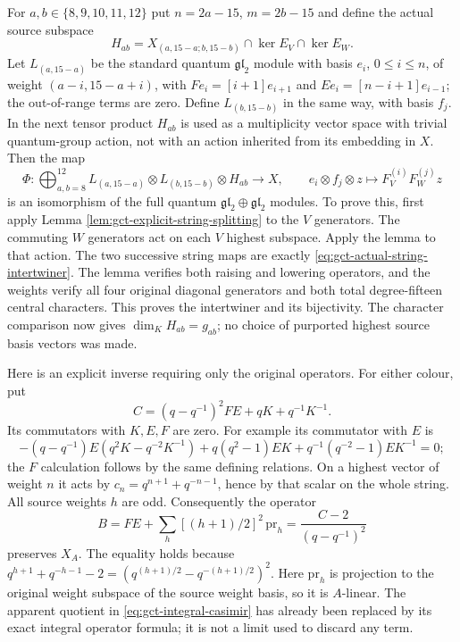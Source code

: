 For $a,b\in\{8,9,10,11,12\}$ put $n=2a-15$, $m=2b-15$ and
define the actual source subspace
\[
 H_{ab}=X_{(a,15-a;b,15-b)}\cap\ker E_V\cap\ker E_W.
\]
Let $L_{(a,15-a)}$ be the standard quantum $\mathfrak{gl}_2$
module with basis $e_i$, $0\leq i\leq n$, of weight
$(a-i,15-a+i)$, with $Fe_i=[i+1]e_{i+1}$ and
$Ee_i=[n-i+1]e_{i-1}$; the out-of-range terms are zero.
Define $L_{(b,15-b)}$ in the same way, with basis $f_j$.
In the next tensor product $H_{ab}$ is used as a multiplicity
vector space with trivial quantum-group action, not with an
action inherited from its embedding in $X$. Then the map
\begin{equation}
 \Phi:\bigoplus_{a,b=8}^{12}
 L_{(a,15-a)}\otimes L_{(b,15-b)}\otimes H_{ab}
 \longrightarrow X,\qquad
 e_i\otimes f_j\otimes z\longmapsto F_V^{(i)}F_W^{(j)}z
 \label{eq:gct-actual-string-intertwiner}
\end{equation}
is an isomorphism of the full quantum
$\mathfrak{gl}_2\oplus\mathfrak{gl}_2$ modules.
To prove this, first apply Lemma
\ref{lem:gct-explicit-string-splitting} to the $V$ generators.
The commuting $W$ generators act on each $V$ highest subspace.
Apply the lemma to that action. The two successive string maps
are exactly \eqref{eq:gct-actual-string-intertwiner}.
The lemma verifies both raising and lowering operators, and
the weights verify all four original diagonal generators and
both total degree-fifteen central characters. This proves the
intertwiner and its bijectivity. The character comparison now
gives $\dim_K H_{ab}=g_{ab}$; no choice of purported highest
source basis vectors was made.

Here is an explicit inverse requiring only the original operators.
For either colour, put
\[
 C=(q-q^{-1})^2FE+qK+q^{-1}K^{-1}.
\]
Its commutators with $K,E,F$ are zero. For example its commutator
with $E$ is
\[
 -(q-q^{-1})E(q^2K-q^{-2}K^{-1})
 +q(q^2-1)EK+q^{-1}(q^{-2}-1)EK^{-1}=0;
\]
the $F$ calculation follows by the same defining relations.
On a highest vector of weight $n$ it acts by
$c_n=q^{n+1}+q^{-n-1}$, hence by that scalar on the whole string.
All source weights $h$ are odd. Consequently the operator
\begin{equation}
 B=FE+\sum_h[(h+1)/2]^2\,\mathrm{pr}_h
       =\frac{C-2}{(q-q^{-1})^2}
 \label{eq:gct-integral-casimir}
\end{equation}
preserves $X_A$. The equality holds because
$q^{h+1}+q^{-h-1}-2=(q^{(h+1)/2}-q^{-(h+1)/2})^2$.
Here $\mathrm{pr}_h$ is projection to the original weight
subspace of the source weight basis, so it is $A$-linear.
The apparent quotient in \eqref{eq:gct-integral-casimir} has
already been replaced by its exact integral operator formula;
it is not a limit used to discard any term.

